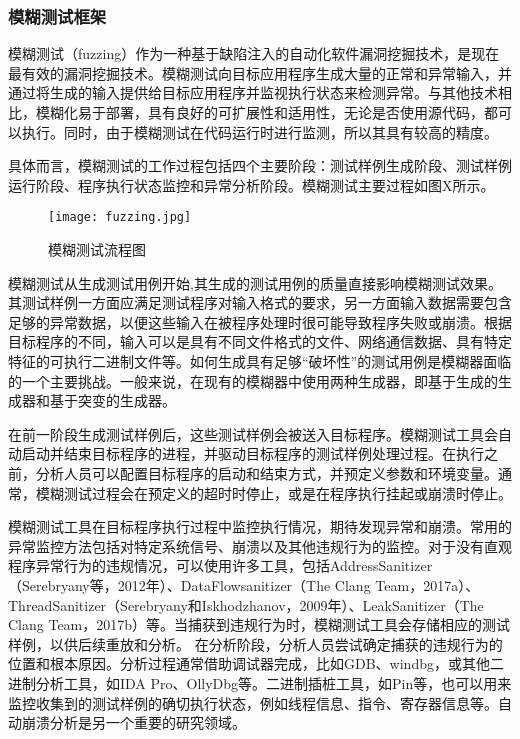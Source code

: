 
\subsubsection{模糊测试框架}
模糊测试（fuzzing）作为一种基于缺陷注入的自动化软件漏洞挖掘技术，是现在最有效的漏洞挖掘技术。模糊测试向目标应用程序生成大量的正常和异常输入，并通过将生成的输入提供给目标应用程序并监视执行状态来检测异常。与其他技术相比，模糊化易于部署，具有良好的可扩展性和适用性，无论是否使用源代码，都可以执行。同时，由于模糊测试在代码运行时进行监测，所以其具有较高的精度。

具体而言，模糊测试的工作过程包括四个主要阶段：测试样例生成阶段、测试样例运行阶段、程序执行状态监控和异常分析阶段。模糊测试主要过程如图X所示。
\begin{figure}[ht]
	\centering
	\texttt{[image: fuzzing.jpg]}
	\caption{模糊测试流程图}
	\label{fig:fuzzing}
\end{figure}

模糊测试从生成测试用例开始,其生成的测试用例的质量直接影响模糊测试效果。其测试样例一方面应满足测试程序对输入格式的要求，另一方面输入数据需要包含足够的异常数据，以便这些输入在被程序处理时很可能导致程序失败或崩溃。根据目标程序的不同，输入可以是具有不同文件格式的文件、网络通信数据、具有特定特征的可执行二进制文件等。如何生成具有足够“破坏性”的测试用例是模糊器面临的一个主要挑战。一般来说，在现有的模糊器中使用两种生成器，即基于生成的生成器和基于突变的生成器。

在前一阶段生成测试样例后，这些测试样例会被送入目标程序。模糊测试工具会自动启动并结束目标程序的进程，并驱动目标程序的测试样例处理过程。在执行之前，分析人员可以配置目标程序的启动和结束方式，并预定义参数和环境变量。通常，模糊测试过程会在预定义的超时时停止，或是在程序执行挂起或崩溃时停止。

模糊测试工具在目标程序执行过程中监控执行情况，期待发现异常和崩溃。常用的异常监控方法包括对特定系统信号、崩溃以及其他违规行为的监控。对于没有直观程序异常行为的违规情况，可以使用许多工具，包括AddressSanitizer（Serebryany等，2012年）、DataFlowsanitizer（The Clang Team，2017a）、ThreadSanitizer（Serebryany和Iskhodzhanov，2009年）、LeakSanitizer（The Clang Team，2017b）等。当捕获到违规行为时，模糊测试工具会存储相应的测试样例，以供后续重放和分析。
在分析阶段，分析人员尝试确定捕获的违规行为的位置和根本原因。分析过程通常借助调试器完成，比如GDB、windbg，或其他二进制分析工具，如IDA Pro、OllyDbg等。二进制插桩工具，如Pin等，也可以用来监控收集到的测试样例的确切执行状态，例如线程信息、指令、寄存器信息等。自动崩溃分析是另一个重要的研究领域。

